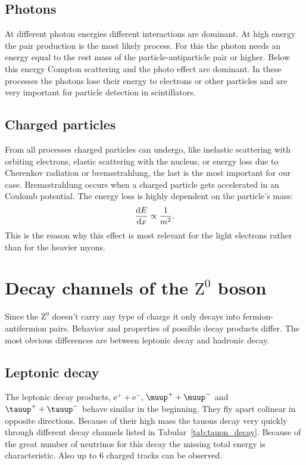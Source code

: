 \documentclass[11pt, english, fleqn, DIV=15, headinclude, BCOR=2cm]{scrreprt}
\begin{document}
\subsection{Photons}

At different photon energies different interactions are dominant. At high
energy the pair production is the most likely process. For
this the photon needs an energy equal to the rest mass of the
particle-antiparticle pair or higher. Below this energy Compton scattering and
the photo effect are dominant. In these processes the photons lose their
energy to electrons or other particles and are very important for particle
detection in scintillators.

\subsection{Charged particles}

From all processes charged particles can undergo, like inelastic scattering
with orbiting electrons, elastic scattering with the nucleus, or energy
loss due to Cherenkov radiation or bremsstrahlung, the last is the most
important for our case. Bremsstrahlung occurs when a charged particle gets
accelerated in an Coulomb potential. The energy loss is highly dependent on
the particle's mass:
\[
        \frac{\mathop{}\!\mathrm d {E}}{\mathop{}\!\mathrm d {x}} \propto \frac 1{m^2}.
\]
This is the reason why this effect is most relevant for the light electrons
rather than for the heavier myons.

\section{Decay channels of the $\mathrm Z^0$ boson}

Since the $\mathrm Z^0$ doesn't carry any type of charge it only decays into
fermion-antifermion pairs. Behavior and properties of possible decay products
differ. The most obvious differences are between leptonic decay and hadronic
decay.

\subsection{Leptonic decay}

The leptonic decay products, $\mathrm e^+ + \mathrm e^-$, $\muup^+ + \muup^-$
and $\tauup^+ + \tauup^-$ behave similar in the beginning. They fly apart
colinear in opposite directions. Because of their high mass the tauons decay
very quickly through different decay channels listed in
Tabular~\ref{tab:tauon_decay}. Because of the great number of neutrinos for
this decay the missing total energy is characteristic. Also up to 6 charged
tracks can be observed.
\end{document}
